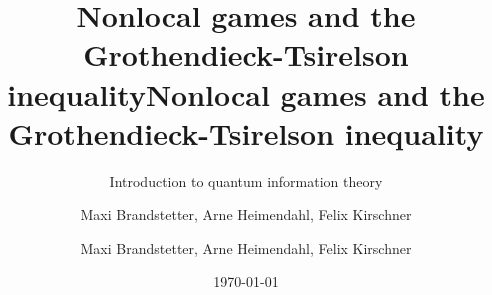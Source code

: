 

		\author{Maxi Brandstetter, Arne Heimendahl, Felix Kirschner}
		\title{Nonlocal games and the Grothendieck-Tsirelson inequality}
		\author[Brandstetter,Heimendahl,Kirschner]{Maxi Brandstetter, Arne Heimendahl, Felix Kirschner}
		\title[Nonlocal Games and beyond]{Nonlocal games and the Grothendieck-Tsirelson inequality}
		\subtitle{Introduction to quantum information theory}
			\date{\today}
		\begin{frame}
		\maketitle
	\end{frame}
	
		
	
	

	
	

